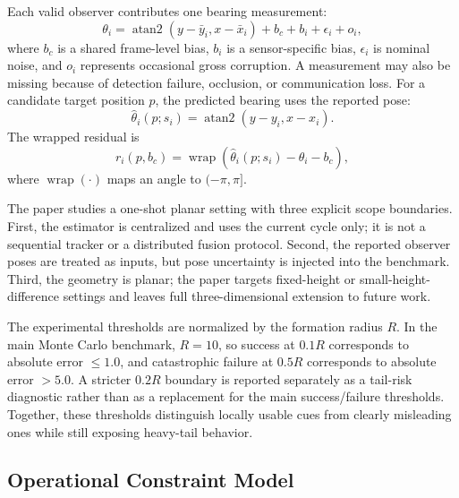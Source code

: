 \documentclass[drones,article,submit,pdftex,moreauthors]{Definitions/mdpi}
\begin{document}
Each valid observer contributes one bearing measurement:
\begin{equation}
\theta_i = \operatorname{atan2}(y-\bar{y}_i, x-\bar{x}_i) + b_c + b_i + \epsilon_i + o_i,
\end{equation}
where $b_c$ is a shared frame-level bias, $b_i$ is a sensor-specific bias, $\epsilon_i$ is nominal noise, and $o_i$ represents occasional gross corruption. A measurement may also be missing because of detection failure, occlusion, or communication loss. For a candidate target position $p$, the predicted bearing uses the reported pose:
\begin{equation}
\hat{\theta}_i(p;s_i)=\operatorname{atan2}(y-y_i,x-x_i).
\end{equation}
The wrapped residual is
\begin{equation}
r_i(p,b_c)=\operatorname{wrap}\!\left(\hat{\theta}_i(p;s_i)-\theta_i-b_c\right),
\end{equation}
where $\operatorname{wrap}(\cdot)$ maps an angle to $(-\pi,\pi]$.

The paper studies a one-shot planar setting with three explicit scope boundaries. First, the estimator is centralized and uses the current cycle only; it is not a sequential tracker or a distributed fusion protocol. Second, the reported observer poses are treated as inputs, but pose uncertainty is injected into the benchmark. Third, the geometry is planar; the paper targets fixed-height or small-height-difference settings and leaves full three-dimensional extension to future work.

The experimental thresholds are normalized by the formation radius $R$. In the main Monte Carlo benchmark, $R=10$, so success at $0.1R$ corresponds to absolute error $\leq 1.0$, and catastrophic failure at $0.5R$ corresponds to absolute error $>5.0$. A stricter $0.2R$ boundary is reported separately as a tail-risk diagnostic rather than as a replacement for the main success/failure thresholds. Together, these thresholds distinguish locally usable cues from clearly misleading ones while still exposing heavy-tail behavior.

\subsection{Operational Constraint Model}
\end{document}
